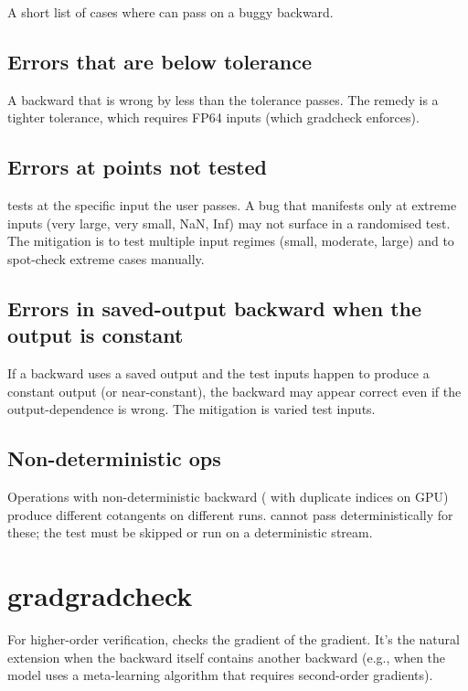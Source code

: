 A short list of cases where  can pass on a buggy
backward.

\subsection{Errors that are below tolerance}
\label{ssec:gradcheck:below_tol}

A backward that is wrong by less than the tolerance passes. The
remedy is a tighter tolerance, which requires FP64 inputs (which
gradcheck enforces).

\subsection{Errors at points not tested}
\label{ssec:gradcheck:not_tested}

 tests at the specific input the user passes. A
bug that manifests only at extreme inputs (very large, very
small, NaN, Inf) may not surface in a randomised test. The
mitigation is to test multiple input regimes (small, moderate,
large) and to spot-check extreme cases manually.

\subsection{Errors in saved-output backward when the output is constant}
\label{ssec:gradcheck:const_out}

If a backward uses a saved output and the test inputs happen to
produce a constant output (or near-constant), the backward may
appear correct even if the output-dependence is wrong. The
mitigation is varied test inputs.

\subsection{Non-deterministic ops}
\label{ssec:gradcheck:nondet}

Operations with non-deterministic backward (
with duplicate indices on GPU) produce different cotangents on
different runs.  cannot pass deterministically for
these; the test must be skipped or run on a deterministic stream.

\section{gradgradcheck}
\label{sec:gradcheck:gradgradcheck}

For higher-order verification,  checks the
gradient of the gradient. It's the natural extension when the
backward itself contains another backward (e.g., when the model
uses a meta-learning algorithm that requires second-order
gradients).

